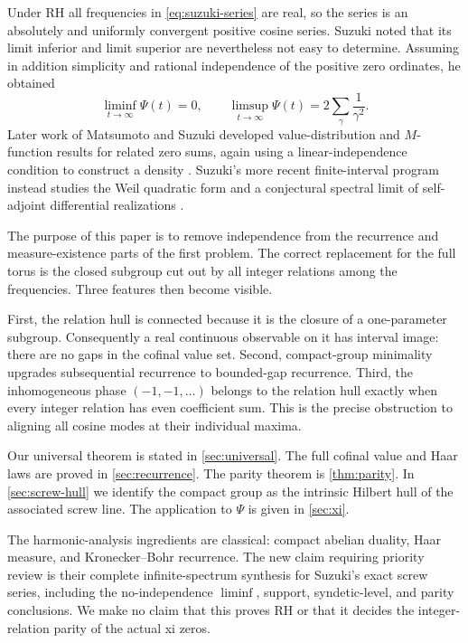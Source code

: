 \documentclass[11pt]{article}
\theoremstyle{remark}
\begin{document}
Under RH all frequencies in \eqref{eq:suzuki-series} are real, so the series is an absolutely and
uniformly convergent positive cosine series.  Suzuki noted that its limit inferior and limit
superior are nevertheless not easy to determine.  Assuming in addition simplicity and rational
independence of the positive zero ordinates, he obtained
\begin{equation}\label{eq:suzuki-LI-endpoints}
 \liminf_{t\to\infty}\Psi(t)=0,
 \qquad
 \limsup_{t\to\infty}\Psi(t)=2\sum_\gamma\frac1{\gamma^2}.
\end{equation}
Later work of Matsumoto and Suzuki developed value-distribution and $M$-function results for
related zero sums, again using a linear-independence condition to construct a density
\cite{MatsumotoSuzuki2025}.  Suzuki's more recent finite-interval program instead studies the Weil
quadratic form and a conjectural spectral limit of self-adjoint differential realizations
\cite{Suzuki2026}.

The purpose of this paper is to remove independence from the recurrence and measure-existence
parts of the first problem.  The correct replacement for the full torus is the closed subgroup cut
out by all integer relations among the frequencies.  Three features then become visible.

First, the relation hull is connected because it is the closure of a one-parameter subgroup.
Consequently a real continuous observable on it has interval image: there are no gaps in the
cofinal value set.  Second, compact-group minimality upgrades subsequential recurrence to bounded-gap
recurrence.  Third, the inhomogeneous phase $(-1,-1,\ldots)$ belongs to the relation hull exactly
when every integer relation has even coefficient sum.  This is the precise obstruction to aligning
all cosine modes at their individual maxima.

Our universal theorem is stated in \cref{sec:universal}.  The full cofinal value and Haar laws are
proved in \cref{sec:recurrence}.  The parity theorem is \cref{thm:parity}.  In
\cref{sec:screw-hull} we identify the compact group as the intrinsic Hilbert hull of the associated
screw line.  The application to $\Psi$ is given in \cref{sec:xi}.

The harmonic-analysis ingredients are classical: compact abelian duality, Haar measure, and
Kronecker--Bohr recurrence.  The new claim requiring priority review is their complete
infinite-spectrum synthesis for Suzuki's exact screw series, including the no-independence
$\liminf$, support, syndetic-level, and parity conclusions.  We make no claim that this proves RH or
that it decides the integer-relation parity of the actual xi zeros.
\end{document}
